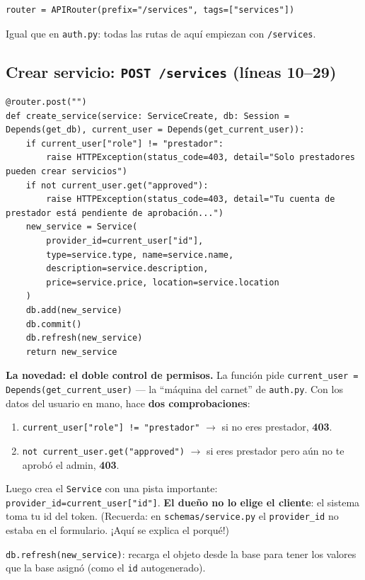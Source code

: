 \documentclass[11pt,a4paper]{article}
\begin{document}
\begin{lstlisting}
router = APIRouter(prefix="/services", tags=["services"])
\end{lstlisting}

Igual que en \texttt{auth.py}: todas las rutas de aquí empiezan con \texttt{/services}.

\subsection{Crear servicio: \texttt{POST /services} (líneas 10--29)}

\begin{lstlisting}
@router.post("")
def create_service(service: ServiceCreate, db: Session = Depends(get_db), current_user = Depends(get_current_user)):
    if current_user["role"] != "prestador":
        raise HTTPException(status_code=403, detail="Solo prestadores pueden crear servicios")
    if not current_user.get("approved"):
        raise HTTPException(status_code=403, detail="Tu cuenta de prestador está pendiente de aprobación...")
    new_service = Service(
        provider_id=current_user["id"],
        type=service.type, name=service.name,
        description=service.description,
        price=service.price, location=service.location
    )
    db.add(new_service)
    db.commit()
    db.refresh(new_service)
    return new_service
\end{lstlisting}

\textbf{La novedad: el doble control de permisos.} La función pide
\texttt{current\_user = Depends(get\_current\_user)} — la ``máquina del carnet'' de
\texttt{auth.py}. Con los datos del usuario en mano, hace \textbf{dos comprobaciones}:

\begin{enumerate}
    \item \texttt{current\_user["role"] != "prestador"} $\rightarrow$ si no eres prestador, \textbf{403}.
    \item \texttt{not current\_user.get("approved")} $\rightarrow$ si eres prestador pero aún no te
    aprobó el admin, \textbf{403}.
\end{enumerate}

Luego crea el \texttt{Service} con una pista importante:
\texttt{provider\_id=current\_user["id"]}. \textbf{El dueño no lo elige el cliente}: el sistema
toma tu id del token. (Recuerda: en \texttt{schemas/service.py} el \texttt{provider\_id} no
estaba en el formulario. ¡Aquí se explica el porqué!)

\texttt{db.refresh(new\_service)}: recarga el objeto desde la base para tener los valores que
la base asignó (como el \texttt{id} autogenerado).
\end{document}
